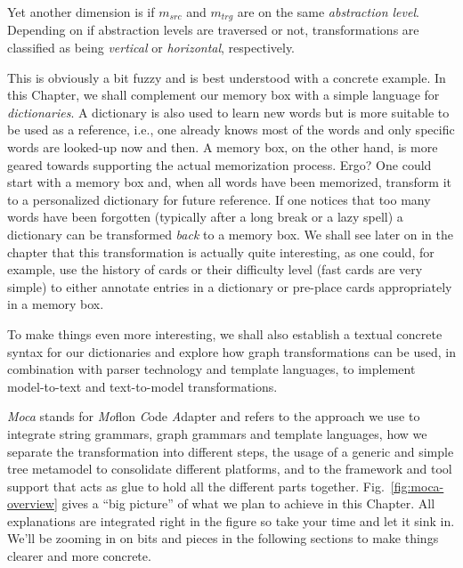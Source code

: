 Yet another dimension is if $m_{src}$ and $m_{trg}$ are on the same \emph{abstraction level}.
Depending on if abstraction levels are traversed or not, transformations are classified as being \emph{vertical} or \emph{horizontal}, respectively. 

This is obviously a bit fuzzy and is best understood with a concrete example. 
In this Chapter, we shall complement our memory box with a simple language for \emph{dictionaries}.
A dictionary is also used to learn new words but is more suitable to be used as a reference, i.e., one already knows most of the words and only specific words are looked-up now and then.
A memory box, on the other hand, is more geared towards supporting the actual memorization process.
Ergo?  One could start with a memory box and, when all words have been memorized, transform it to a personalized dictionary for future reference.
If one notices that too many words have been forgotten (typically after a long break or a lazy spell) a dictionary can be transformed \emph{back} to a memory box.
We shall see later on in the chapter that this transformation is actually quite interesting, as one could, for example, use the history of cards or their difficulty level (fast cards are very simple) to either annotate entries in a dictionary or pre-place cards appropriately in a memory box. 

To make things even more interesting, we shall also establish a textual concrete syntax for our dictionaries and explore how graph transformations can be used, in combination with parser technology and template languages, to implement model-to-text and text-to-model transformations.

\emph{Moca} stands for \emph{Mo}flon \emph{C}ode \emph{A}dapter and refers to the approach we use to integrate string grammars, graph grammars and template languages, how we separate the transformation into different steps, the usage of a generic and simple tree metamodel to consolidate different platforms, and to the framework and tool support that acts as glue to hold all the different parts together.
Fig.~\ref{fig:moca-overview} gives a ``big picture'' of what we plan to achieve in this Chapter.
All explanations are integrated right in the figure so take your time and let it sink in.
We'll be zooming in on bits and pieces in the following sections to make things clearer and more concrete.

